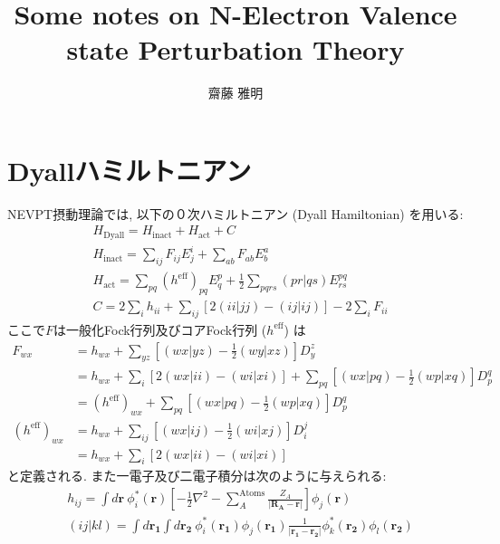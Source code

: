 \documentclass[11pt,pra,aps]{revtex4}
\begin{document}
\title{Some notes on N-Electron Valence state Perturbation Theory}
\author{齋藤 雅明}

\maketitle

\section{Dyallハミルトニアン}

NEVPT摂動理論\cite{angeliintroduction2001,angelin-electron2002,angelinew2006,angelithird-order2006}では, 以下の０次ハミルトニアン (Dyall Hamiltonian) \cite{dyallthe1995}を用いる:
%
\begin{align}
  & H_\text{Dyall} = H_\text{inact} + H_\text{act} + C \label{eq:Dyall}\\
  & H_\text{inact} = \sum_{ij} F_{ij} E^i_j + \sum_{ab} F_{ab} E^a_b \\ 
  & H_\text{act}   = \sum_{pq} (h^\text{eff})_{pq}E^p_q + \frac{1}{2}\sum_{pqrs} (pr|qs) E^{pq}_{rs} \\ 
  & C = 2\sum_i h_{ii} + \sum_{ij} [2(ii|jj)-(ij|ij)] - 2\sum_i F_{ii}\label{eq:C}
\end{align}
%
ここで$F$は一般化Fock行列及びコアFock行列 ($h^\text{eff}$) は
\begin{align}
  F_{wx} &= h_{wx} + \sum_{yz} \left[ (wx|yz) - \frac{1}{2}(wy|xz)\right] D_y^z \nonumber \\
         &= h_{wx} + \sum_{i} \left[2(wx|ii) - (wi|xi)\right] + \sum_{pq} \left[(wx|pq)-\frac{1}{2}(wp|xq)\right] D_p^q \nonumber \\
         &= (h^\text{eff})_{wx} + \sum_{pq} \left[(wx|pq)-\frac{1}{2}(wp|xq)\right] D_p^q \label{eq:genFock} \\
  (h^\text{eff})_{wx} &= h_{wx} + \sum_{ij} \left[ (wx|ij) - \frac{1}{2}(wi|xj)\right] D_i^j \nonumber \\
                      &= h_{wx} + \sum_{i} \left[2(wx|ii) - (wi|xi)\right] \label{eq:heff}
\end{align}
と定義される. また一電子及び二電子積分は次のように与えられる:
%
\begin{align}
  & h_{ij} = \int d\mathbf{r} \ \phi^{*}_i (\mathbf{r})\left[-\frac{1}{2}\nabla^{2}-\sum_A^\text{Atoms} \frac{Z_A}{|\mathbf{R_A}-\mathbf{r}|}\right]\phi_j(\mathbf{r}) \\
  & (ij|kl) = \int d\mathbf{r_1} \int d\mathbf{r_2} \ \phi^{*}_i (\mathbf{r_1}) \phi_j (\mathbf{r_1}) \frac{1}{|\mathbf{r_1}-\mathbf{r_2}|} \phi^{*}_k(\mathbf{r_2}) \phi_l(\mathbf{r_2}) \\
\end{align}
\end{document}
